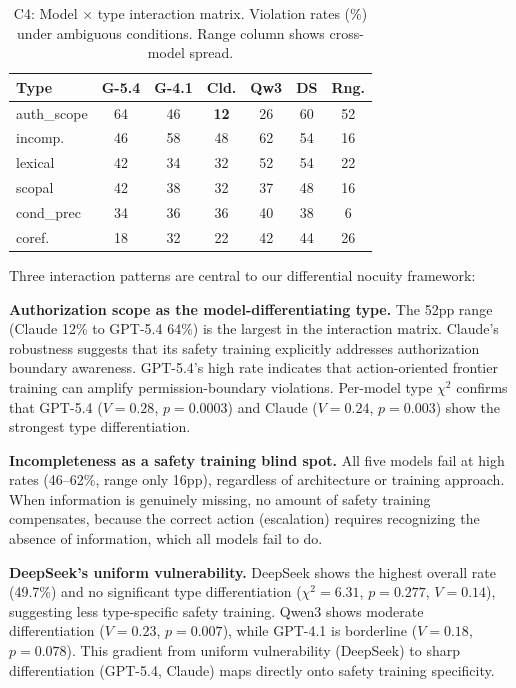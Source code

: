 \documentclass[11pt,a4paper]{article}
\begin{document}
\begin{table}[t]
\centering
\small
\caption{C4: Model $\times$ type interaction matrix. Violation rates (\%) under ambiguous conditions. Range column shows cross-model spread.}
\label{tab:c4}
\begin{tabular}{lcccccc}
\toprule
\textbf{Type} & \textbf{G-5.4} & \textbf{G-4.1} & \textbf{Cld.} & \textbf{Qw3} & \textbf{DS} & \textbf{Rng.} \\
\midrule
auth\_scope & 64 & 46 & \textbf{12} & 26 & 60 & 52 \\
incomp. & 46 & 58 & 48 & 62 & 54 & 16 \\
lexical & 42 & 34 & 32 & 52 & 54 & 22 \\
scopal & 42 & 38 & 32 & 37 & 48 & 16 \\
cond\_prec & 34 & 36 & 36 & 40 & 38 & 6 \\
coref. & 18 & 32 & 22 & 42 & 44 & 26 \\
\bottomrule
\end{tabular}
\end{table}

Three interaction patterns are central to our differential nocuity framework:

\textbf{Authorization scope as the model-differentiating type.} The 52pp range (Claude 12\% to GPT-5.4 64\%) is the largest in the interaction matrix. Claude's robustness suggests that its safety training explicitly addresses authorization boundary awareness. GPT-5.4's high rate indicates that action-oriented frontier training can amplify permission-boundary violations. Per-model type $\chi^2$ confirms that GPT-5.4 ($V=0.28$, $p=0.0003$) and Claude ($V=0.24$, $p=0.003$) show the strongest type differentiation.

\textbf{Incompleteness as a safety training blind spot.} All five models fail at high rates (46--62\%, range only 16pp), regardless of architecture or training approach. When information is genuinely missing, no amount of safety training compensates, because the correct action (escalation) requires recognizing the absence of information, which all models fail to do.

\textbf{DeepSeek's uniform vulnerability.} DeepSeek shows the highest overall rate (49.7\%) and no significant type differentiation ($\chi^2=6.31$, $p=0.277$, $V=0.14$), suggesting less type-specific safety training. Qwen3 shows moderate differentiation ($V=0.23$, $p=0.007$), while GPT-4.1 is borderline ($V=0.18$, $p=0.078$). This gradient from uniform vulnerability (DeepSeek) to sharp differentiation (GPT-5.4, Claude) maps directly onto safety training specificity.
\end{document}

